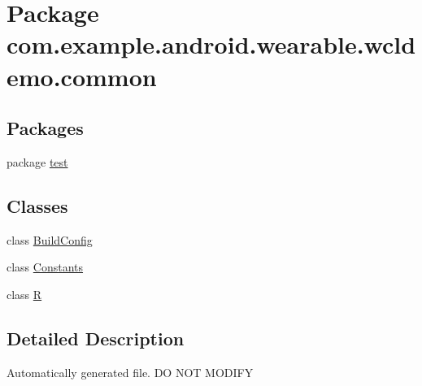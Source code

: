 \hypertarget{namespacecom_1_1example_1_1android_1_1wearable_1_1wcldemo_1_1common}{}\section{Package com.\+example.\+android.\+wearable.\+wcldemo.\+common}
\label{namespacecom_1_1example_1_1android_1_1wearable_1_1wcldemo_1_1common}
\subsection*{Packages}
\begin{DoxyCompactItemize}
\item 
package \hyperlink{namespacecom_1_1example_1_1android_1_1wearable_1_1wcldemo_1_1common_1_1test}{test}
\end{DoxyCompactItemize}
\subsection*{Classes}
\begin{DoxyCompactItemize}
\item 
class \hyperlink{classcom_1_1example_1_1android_1_1wearable_1_1wcldemo_1_1common_1_1BuildConfig}{Build\+Config}
\item 
class \hyperlink{classcom_1_1example_1_1android_1_1wearable_1_1wcldemo_1_1common_1_1Constants}{Constants}
\item 
class \hyperlink{classcom_1_1example_1_1android_1_1wearable_1_1wcldemo_1_1common_1_1R}{R}
\end{DoxyCompactItemize}


\subsection{Detailed Description}
Automatically generated file. DO N\+OT M\+O\+D\+I\+FY 